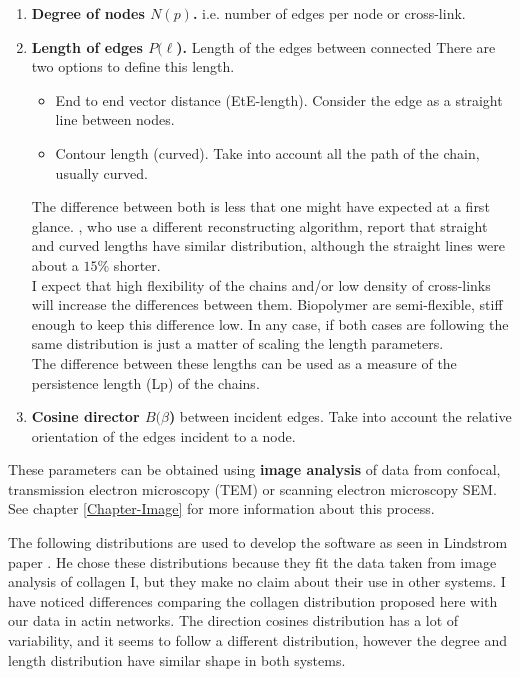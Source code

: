 \begin{enumerate} 
\item \textbf{Degree of nodes $N(p)$.} i.e. number of edges per node
or cross-link.
\item \textbf{Length of edges $P(\ell$).} Length of the edges
between connected
There are two options to define this length.
\begin{itemize}
\item End to end vector distance (EtE-length). Consider the edge as a straight
line between nodes.

\item Contour length (curved). Take into account all the path of the chain,
usually curved.
\end{itemize}

The difference between both is less that one
might have expected at a first glance. \citet{nisslert_identification_2007},
who use a different reconstructing algorithm, report that straight and curved
lengths have similar distribution, although the straight lines were about a
$15\%$ shorter.\\
I expect that high flexibility of the chains and/or low density of cross-links
will increase the differences between them. Biopolymer are semi-flexible, stiff
enough to keep this difference low.
In any case, if both cases are following the same distribution is just a matter
of scaling the length parameters.\\
The difference between these lengths can be used as a measure of the
persistence length (\gls{Lp}) of the chains.
  

\item \textbf{Cosine director $B(\beta$)} between incident edges. Take into
account the relative orientation of the edges incident to a node.


\end{enumerate}

These parameters can be obtained using \textbf{image analysis} of data from
\gls{confocal}, transmission electron microscopy (\gls{TEM}) or
scanning electron microscopy \gls{SEM}. See chapter \ref{Chapter-Image} for
more information about this process.

The following distributions are used to develop the software as seen in
Lindstrom paper \citep{lindstrom_biopolymer_2010}. He chose these distributions
because they fit the data taken from image analysis of collagen I, but they make
no claim about their use in other systems. I have noticed differences comparing
 the collagen distribution proposed here with our data in actin networks. The
 direction cosines distribution has a lot of variability, and it seems to
 follow a different distribution, however the degree and length distribution
 have similar shape in both systems.


